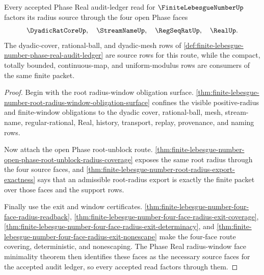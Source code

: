 \begin{theorem}
\label{thm:finite-lebesgue-number-phase-real-audit-ledger-source}
Every accepted Phase Real audit-ledger read for $\FiniteLebesgueNumberUp$ factors its radius source through the four open Phase faces
$$
\DyadicRatCoreUp,\quad \StreamNameUp,\quad \RegSeqRatUp,\quad \RealUp .
$$
The dyadic-cover, rational-ball, and dyadic-mesh rows of \autoref{def:finite-lebesgue-number-phase-real-audit-ledger} are source rows for this route, while the compact, totally bounded, continuous-map, and uniform-modulus rows are consumers of the same finite packet.
\end{theorem}
\begin{proof}
Begin with the root radius-window obligation surface. \autoref{thm:finite-lebesgue-number-root-radius-window-obligation-surface} confines the visible positive-radius and finite-window obligations to the dyadic cover, rational-ball, mesh, stream-name, regular-rational, Real, history, transport, replay, provenance, and naming rows.

Now attach the open Phase root-unblock route. \autoref{thm:finite-lebesgue-number-open-phase-root-unblock-radius-coverage} exposes the same root radius through the four source faces, and \autoref{thm:finite-lebesgue-number-root-radius-export-exactness} says that an admissible root-radius export is exactly the finite packet over those faces and the support rows.

Finally use the exit and window certificates. \autoref{thm:finite-lebesgue-number-four-face-radius-readback}, \autoref{thm:finite-lebesgue-number-four-face-radius-exit-coverage}, \autoref{thm:finite-lebesgue-number-four-face-radius-exit-determinacy}, and \autoref{thm:finite-lebesgue-number-four-face-radius-exit-nonescape} make the four-face route covering, deterministic, and nonescaping. The Phase Real radius-window face minimality theorem then identifies these faces as the necessary source faces for the accepted audit ledger, so every accepted read factors through them.
\end{proof}

